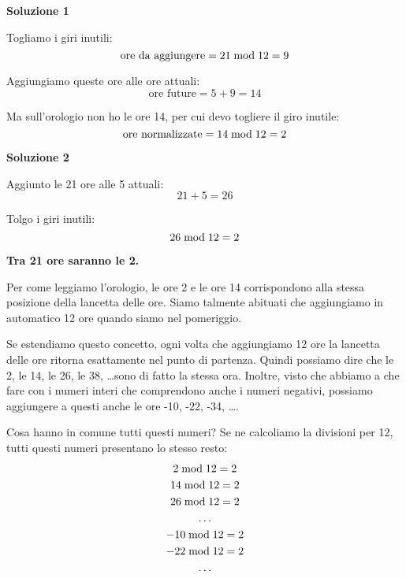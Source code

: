 \begin{soluzionenonum}
    \textbf{Soluzione 1}

    Togliamo i giri inutili:
    \begin{equation*}
        \text{ore da aggiungere} = 21  \bmod  12 = 9
    \end{equation*}

    Aggiungiamo queste ore alle ore attuali:
    \begin{equation*}
        \text{ore future} = 5 + 9 = 14
    \end{equation*}

    Ma sull'orologio non ho le ore 14, per cui devo togliere il giro inutile:
    \begin{equation*}
        \text{ore normalizzate} = 14  \bmod  12 = 2
    \end{equation*}

    \textbf{Soluzione 2}

    Aggiunto le 21 ore alle 5 attuali:
    \begin{equation*}
        21 + 5 = 26
    \end{equation*}

    Tolgo i giri inutili:
    \begin{equation*}
        26  \bmod  12 = 2
    \end{equation*}

    \textbf{Tra 21 ore saranno le 2.}
\end{soluzionenonum}

Per come leggiamo l'orologio, le ore 2 e le ore 14 corrispondono alla stessa posizione della lancetta delle ore.
Siamo talmente abituati che aggiungiamo in automatico 12 ore quando siamo nel pomeriggio.

Se estendiamo questo concetto, ogni volta che aggiungiamo 12 ore la lancetta delle ore ritorna esattamente nel punto di partenza.
Quindi possiamo dire che le 2, le 14, le 26, le 38, \dots sono di fatto la stessa ora.
Inoltre, visto che abbiamo a che fare con i numeri interi che comprendono anche i numeri negativi, possiamo aggiungere a questi anche le ore -10, -22, -34, \dots.

Cosa hanno in comune tutti questi numeri?
Se ne calcoliamo la divisioni per 12, tutti questi numeri presentano lo stesso resto:
\begin{gather*}
    2  \bmod  12 = 2 \\
    14  \bmod  12 = 2 \\
    26  \bmod  12 = 2 \\
    \dots \\
    -10  \bmod  12 = 2 \\
    -22  \bmod  12 = 2 \\
    \dots
\end{gather*}

